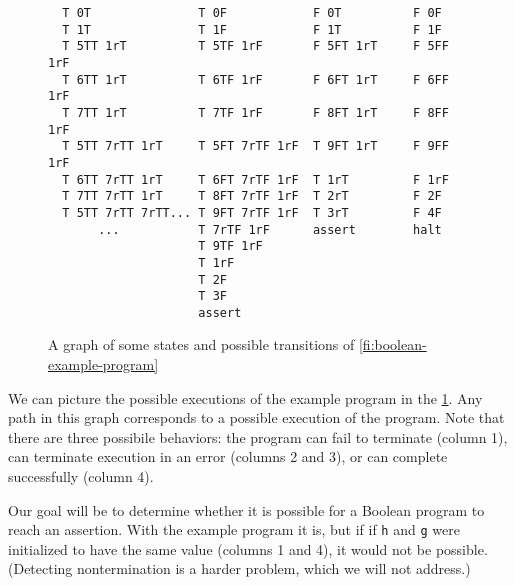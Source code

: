 \documentclass{article}
\newcommand{\Code}[1]{\texttt{#1}}
\begin{document}
\begin{figure}
\begin{verbatim}
  T 0T               T 0F            F 0T          F 0F
  T 1T               T 1F            F 1T          F 1F
  T 5TT 1rT          T 5TF 1rF       F 5FT 1rT     F 5FF 1rF
  T 6TT 1rT          T 6TF 1rF       F 6FT 1rT     F 6FF 1rF
  T 7TT 1rT          T 7TF 1rF       F 8FT 1rT     F 8FF 1rF
  T 5TT 7rTT 1rT     T 5FT 7rTF 1rF  T 9FT 1rT     F 9FF 1rF
  T 6TT 7rTT 1rT     T 6FT 7rTF 1rF  T 1rT         F 1rF
  T 7TT 7rTT 1rT     T 8FT 7rTF 1rF  T 2rT         F 2F
  T 5TT 7rTT 7rTT... T 9FT 7rTF 1rF  T 3rT         F 4F
       ...           T 7rTF 1rF      assert        halt
                     T 9TF 1rF
                     T 1rF
                     T 2F
                     T 3F
                     assert
\end{verbatim}
\caption{A graph of some states and possible transitions of
  \cref{fi:boolean-example-program}}
\label{fi:program-transition-graph}
\end{figure}

We can picture the possible executions of the example program in the
\cref{fi:program-transition-graph}.
Any path in this graph corresponds to a possible execution of the
program. Note that there are three possibile behaviors: the program
can fail to terminate (column 1), can terminate execution in an error
(columns 2 and 3), or can complete successfully (column 4).

Our goal will be to determine whether it is possible for a Boolean
program to reach an assertion. With the example program it is, but if
if \Code{h} and \Code{g} were initialized to have the same value
(columns 1 and 4), it would not be possible. (Detecting nontermination
is a harder problem, which we will not address.)
\end{document}
